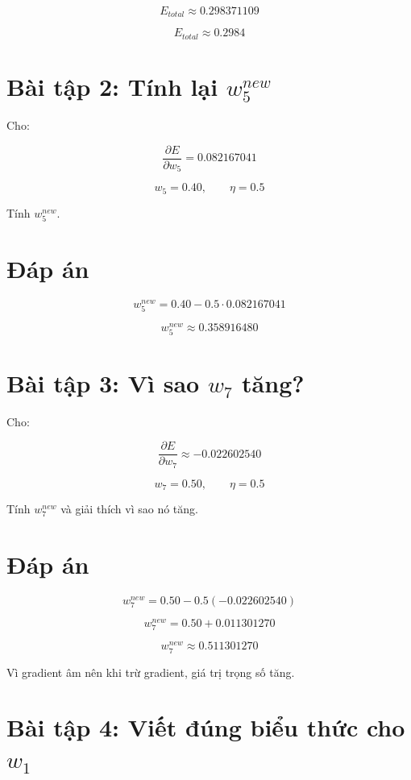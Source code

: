 \documentclass[12pt,a4paper]{report}
\begin{document}
\[
    E_{total}\approx 0.298371109
\]

\[
    E_{total}\approx 0.2984
\]

\section*{Bài tập 2: Tính lại $w_5^{new}$}

Cho:

\[
    \frac{\partial E}{\partial w_5}=0.082167041
\]

\[
    w_5=0.40,\qquad \eta=0.5
\]

Tính $w_5^{new}$.

\section*{Đáp án}

\[
    w_5^{new}
    =
    0.40
    -
    0.5\cdot 0.082167041
\]

\[
    w_5^{new}
    \approx 0.358916480
\]

\section*{Bài tập 3: Vì sao $w_7$ tăng?}

Cho:

\[
    \frac{\partial E}{\partial w_7}\approx -0.022602540
\]

\[
    w_7=0.50,\qquad \eta=0.5
\]

Tính $w_7^{new}$ và giải thích vì sao nó tăng.

\section*{Đáp án}

\[
    w_7^{new}
    =
    0.50
    -
    0.5(-0.022602540)
\]

\[
    w_7^{new}
    =
    0.50
    +
    0.011301270
\]

\[
    w_7^{new}
    \approx 0.511301270
\]

Vì gradient âm nên khi trừ gradient, giá trị trọng số tăng.

\section*{Bài tập 4: Viết đúng biểu thức cho $w_1$}
\end{document}
